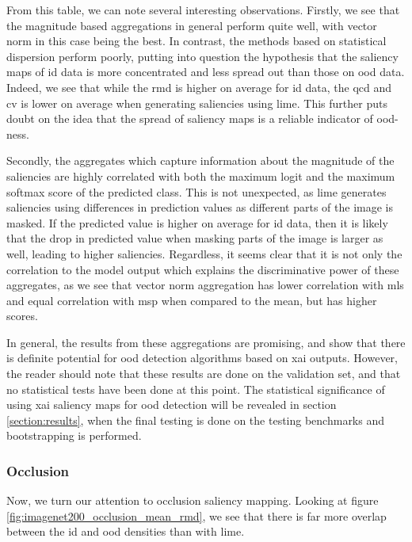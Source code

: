 \documentclass[UKenglish]{uiomasterthesis} %
\theoremstyle{definition}
\begin{document}
From this table, we can note several interesting observations. Firstly, we see that the magnitude based aggregations in general perform quite well, with vector norm in this case being the best. In contrast, the methods based on statistical dispersion perform poorly, putting into question the hypothesis that the saliency maps of \ac{id} data is more concentrated and less spread out than those on \ac{ood} data. Indeed, we see that while the \ac{rmd} is higher on average for \ac{id} data, the \ac{qcd} and \ac{cv} is lower on average when generating saliencies using \ac{lime}. This further puts doubt on the idea that the spread of saliency maps is a reliable indicator of \ac{ood}-ness.

Secondly, the aggregates which capture information about the magnitude of the saliencies are highly correlated with both the maximum logit and the maximum softmax score of the predicted class. This is not unexpected, as \ac{lime} generates saliencies using differences in prediction values as different parts of the image is masked. If the predicted value is higher on average for \ac{id} data, then it is likely that the drop in predicted value when masking parts of the image is larger as well, leading to higher saliencies. Regardless, it seems clear that it is not only the correlation to the model output which explains the discriminative power of these aggregates, as we see that vector norm aggregation has lower correlation with \ac{mls} and equal correlation with \ac{msp} when compared to the mean, but has higher scores.

In general, the results from these aggregations are promising, and show that there is definite potential for \ac{ood} detection algorithms based on \ac{xai} outputs. However, the reader should note that these results are done on the validation set, and that no statistical tests have been done at this point. The statistical significance of using \ac{xai} saliency maps for \ac{ood} detection will be revealed in section \ref{section:results}, when the final testing is done on the testing benchmarks and bootstrapping is performed.

\subsubsection{Occlusion}

Now, we turn our attention to occlusion saliency mapping. Looking at figure \ref{fig:imagenet200_occlusion_mean_rmd}, we see that there is far more overlap between the \ac{id} and \ac{ood} densities than with \ac{lime}.
\end{document}
